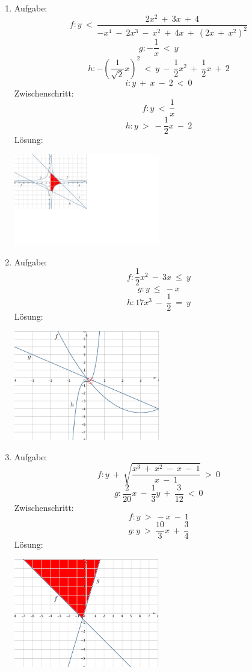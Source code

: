 \begin{enumerate}
\begin{center}
					\end{center}
	\item Aufgabe:
					\[f : y \ < \ \frac {2x^2 \ + \ 3x \ + \ 4} {- x^4 \ - \ 2x^3 \ - \ x^2 \ + \ 4x \ + \ (2x \ + \ x^2)^2} \]
					\[g : - \frac 1 x \ < \ y \]
					\[h : - ( \frac 1 {\sqrt 2} x )^2 \ < \ y \ - \ \frac 1 2 x^2 \ + \ \frac 1 2 x \ + \ 2 \]
					\[i : y \ + \ x \ - \ 2 \ < \ 0 \]
				Zwischenschritt:
				\[f : y \ < \ \frac 1 x\]
				\[h : y \ > \ -\frac 1 2 x \ - \ 2\]
				L\"osung:
					\begin{center}
						\includegraphics[width=0.5\textwidth]{img/Aufgaben/Graphisch/A4.PNG}
					\end{center}
	\item Aufgabe:
					\[f : \frac 1 2 x^2 \ - \ 3x \ \leq \ y\]
					\[g : y \ \leq \ -x\]
					\[h : 17x^3 \ - \ \frac 1 2 \ = \ y\]
				L\"osung:
					\begin{center}
						\includegraphics[width=0.5\textwidth]{img/Aufgaben/Graphisch/A5.PNG}
					\end{center}
	\item Aufgabe:
					\[f : y \ + \ \sqrt {\frac {x^3 \ + \ x^2 \ - \ x \ - \ 1} {x \ - \ 1}} \ > \ 0 \]
					\[g : \frac 2 {20} x \ - \ \frac 1 3 y \ + \ \frac 3 {12} \ < \ 0\]
				Zwischenschritt:
				\[f : y \ > \ -x \ - \ 1\]
				\[g : y \ > \ \frac {10} 3 x \ + \ \frac 3 4\]
				L\"osung:
					\begin{center}
						\includegraphics[width=0.5\textwidth]{img/Aufgaben/Graphisch/A6.PNG}

\end{center}
\end{enumerate}
